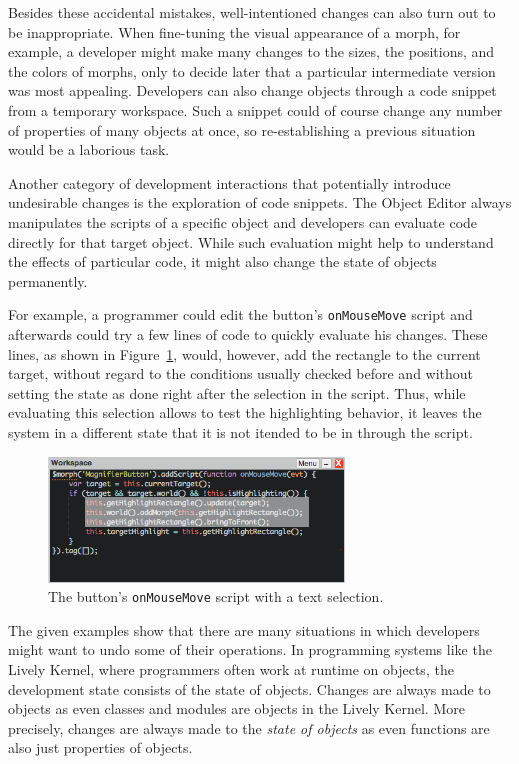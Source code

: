 Besides these accidental mistakes, well-intentioned changes can also turn out to be inappropriate.
When fine-tuning the visual appearance of a morph, for example, a developer might make many changes to the sizes, the positions, and the colors of morphs, only to decide later that a particular intermediate version was most appealing.
Developers can also change objects through a code snippet from a temporary workspace.
Such a snippet could of course change any number of properties of many objects at once, so re-establishing a previous situation would be a laborious task.

Another category of development interactions that potentially introduce undesirable changes is the exploration of code snippets.
The Object Editor always manipulates the scripts of a specific object and developers can evaluate code directly for that target object.
While such evaluation might help to understand the effects of particular code, it might also change the state of objects permanently.

For example, a programmer could edit the button's \lstinline{onMouseMove} script and afterwards could try a few lines of code to quickly evaluate his changes.
These lines, as shown in Figure~\ref{fig:onMouseOverScript}, would, however, add the rectangle to the current target, without regard to the conditions usually checked before and without setting the state as done right after the selection in the script.
Thus, while evaluating this selection allows to test the highlighting behavior, it leaves the system in a different state that it is not itended to be in through the script.

\begin{figure}[h]
    \centering
    \includegraphics[width=0.7\textwidth]{figures/3_motivation/4_workspaceDoIt.png}
    \caption{The button's \lstinline{onMouseMove} script with a text selection.}
    \label{fig:onMouseOverScript}
\end{figure}

The given examples show that there are many situations in which developers might want to undo some of their operations.
In programming systems like the Lively Kernel, where programmers often work at runtime on objects, the development state consists of the state of objects.
Changes are always made to objects as even classes and modules are objects in the Lively Kernel.
More precisely, changes are always made to the \emph{state of objects} as even functions are also just properties of objects.

